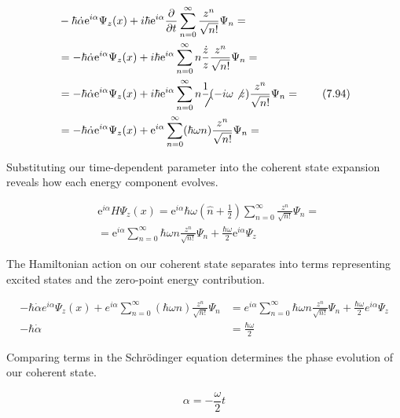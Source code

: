 \documentclass[italian]{HKNdocument}
\begin{document}
\begin{align*}
& -\hbar \dot{\alpha} \mathrm{e}^{i \alpha} \Psi_{z}(x)+i \hbar \mathrm{e}^{i \alpha} \frac{\partial}{\partial t} \sum_{n=0}^{\infty} \frac{z^{n}}{\sqrt{n!}} \Psi_{n}= \\
& =-\hbar \dot{\alpha} \mathrm{e}^{i \alpha} \Psi_{z}(x)+i \hbar \mathrm{e}^{i \alpha} \sum_{n=0}^{\infty} n \frac{\dot{z}}{z} \frac{z^{n}}{\sqrt{n!}} \Psi_{n}= \\
& =-\hbar \dot{\alpha} \mathrm{e}^{i \alpha} \Psi_{z}(x)+i \hbar \mathrm{e}^{i \alpha} \sum_{n=0}^{\infty} n \frac{1}{\not \not ~}(-i \omega \not z) \frac{z^{n}}{\sqrt{n!}} \Psi_{n}=  \tag{7.94}\\
& =-\hbar \dot{\alpha} \mathrm{e}^{i \alpha} \Psi_{z}(x)+\mathrm{e}^{i \alpha} \sum_{n=0}^{\infty}(\hbar \omega n) \frac{z^{n}}{\sqrt{n!}} \Psi_{n}=
\end{align*}

Substituting our time-dependent parameter into the coherent state expansion reveals how each energy component evolves.

\begin{align*}
& \mathrm{e}^{i \alpha} H \Psi_{z}(x)=\mathrm{e}^{i \alpha} \hbar \omega\left(\hat{n}+\frac{1}{2}\right) \sum_{n=0}^{\infty} \frac{z^{n}}{\sqrt{n!}} \Psi_{n}=  \tag{7.95}\\
& =\mathrm{e}^{i \alpha} \sum_{n=0}^{\infty} \hbar \omega n \frac{z^{n}}{\sqrt{n!}} \Psi_{n}+\frac{\hbar \omega}{2} \mathrm{e}^{i \alpha} \Psi_{z}
\end{align*}

The Hamiltonian action on our coherent state separates into terms representing excited states and the zero-point energy contribution.

\begin{align*}
-\hbar \dot{\alpha} e^{i \alpha} \Psi_{z}(x)+e^{i \alpha} \sum_{n=0}^{\infty}(\hbar \omega n) \frac{z^{n}}{\sqrt{n!}} \Psi_{n} & =e^{i \alpha} \sum_{n=0}^{\infty} \hbar \omega n \frac{z^{n}}{\sqrt{n!}} \Psi_{n}+\frac{\hbar \omega}{2} e^{i \alpha} \Psi_{z}  \tag{7.96}\\
-\hbar \dot{\alpha} & =\frac{\hbar \omega}{2}
\end{align*}

Comparing terms in the Schrödinger equation determines the phase evolution of our coherent state.

\begin{equation*}
\alpha=-\frac{\omega}{2} t \tag{7.97}
\end{equation*}
\end{document}
